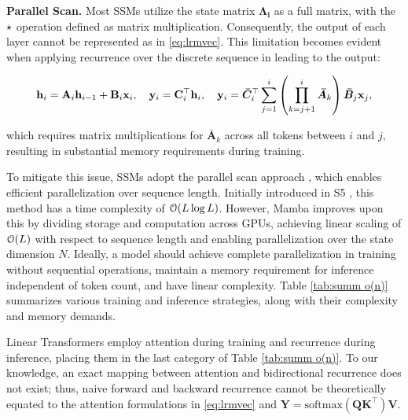 \textbf{Parallel Scan.} Most SSMs utilize the state matrix \(\boldsymbol{\Lambda_i}\) as a full matrix, with the \(\textcolor{black}{\star}\) operation defined as matrix multiplication. Consequently, the output of each layer cannot be represented as in \eqref{eq:lrmvec}. This limitation becomes evident when applying recurrence over the discrete sequence in leading to the output:

\begin{align}
\label{eq:ssm}
\mathbf{h}_i = \mathbf{A}_i\mathbf{h}_{i-1} +\mathbf{B}_i\mathbf{x}_i , \quad
\mathbf{y}_i = \mathbf{C}^\top_i\mathbf{h}_i, \quad
\mathbf{y}_i = \boldsymbol{\bar{C}}_{i}^\top \sum_{j=1}^i \left( \prod_{k=j+1}^i \boldsymbol{\bar{A}}_{k} \right) \boldsymbol{\bar{B}}_{j} \mathbf{x}_j, 
\end{align}

which requires matrix multiplications for \(\boldsymbol{\bar{A}}_{k}\) across all tokens between \(i\) and \(j\), resulting in substantial memory requirements during training.

To mitigate this issue, SSMs adopt the parallel scan approach \citep{scanalg, scan2}, which enables efficient parallelization over sequence length. Initially introduced in S5 \citep{s5}, this method has a time complexity of \(\mathcal{O}(L \log L)\). However, Mamba \citep{mamba} improves upon this by dividing storage and computation across GPUs, achieving linear scaling of \(\mathcal{O}(L)\) with respect to sequence length and enabling parallelization over the state dimension \(N\). 
Ideally, a model should achieve complete parallelization in training without sequential operations, maintain a memory requirement for inference independent of token count, and have linear complexity. Table \ref{tab:summ o(n)} summarizes various training and inference strategies, along with their complexity and memory demands. 

Linear Transformers \citep{retnet, trans_rnn} employ attention during training and recurrence during inference, placing them in the last category of Table \ref{tab:summ o(n)}. To our knowledge, an exact mapping between attention and bidirectional recurrence does not exist; thus, naive forward and backward recurrence cannot be theoretically equated to the attention formulations in \eqref{eq:lrmvec} and  $    \mathbf{Y} = \text{softmax}\left(\mathbf{Q} \mathbf{K}^\top\right) 
    \mathbf{V}$. 




